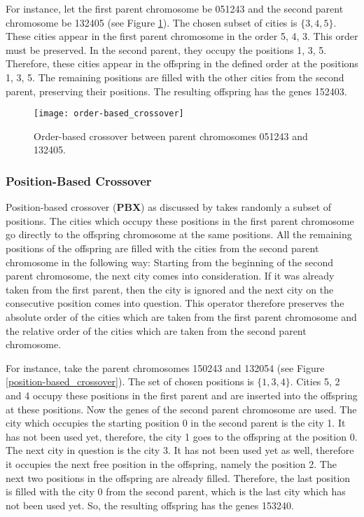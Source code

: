 For instance, let the first parent chromosome be 051243 and the second parent chromosome be 132405 (see Figure \ref{order-based_crossover}). The chosen subset of cities is $\{3,4,5\}$. These cities appear in the first parent chromosome in the order 5, 4, 3. This order must be preserved. In the second parent, they occupy the positions 1, 3, 5. Therefore, these cities appear in the offspring in the defined order at the positions 1, 3, 5. The remaining positions are filled with the other cities from the second parent, preserving their positions. The resulting offspring has the genes 152403.

\begin{figure}[htp] \centering
	\centering
	\texttt{[image: order-based\_crossover]}
	\caption{Order-based crossover between parent chromosomes 051243 and 132405.}
	\label{order-based_crossover}
\end{figure}

\subsubsection{Position-Based Crossover}
\label{subsubsec:position_based}
Position-based crossover (\textbf{PBX}) as discussed by \citeauthor{potvin1996genetic} \cite{potvin1996genetic} takes randomly a subset of positions. The cities which occupy these positions in the first parent chromosome go directly to the offspring chromosome at the same positions. All the remaining positions of the offspring are filled with the cities from the second parent chromosome in the following way: Starting from the beginning of the second parent chromosome, the next city comes into consideration. If it was already taken from the first parent, then the city is ignored and the next city on the consecutive position comes into question. This operator therefore preserves the absolute order of the cities which are taken from the first parent chromosome and the relative order of the cities which are taken from the second parent chromosome.\par
For instance, take the parent chromosomes 150243 and 132054 (see Figure \ref{position-based_crossover}). The set of chosen positions is $\{1,3,4\}$. Cities 5, 2 and 4 occupy these positions in the first parent and are inserted into the offspring at these positions. Now the genes of the second parent chromosome are used. The city which occupies the starting position 0 in the second parent is the city 1. It has not been used yet, therefore, the city 1 goes to the offspring at the position 0. The next city in question is the city 3. It has not been used yet as well, therefore it occupies the next free position in the offspring, namely the position 2. The next two positions in the offspring are already filled. Therefore, the last position is filled with the city 0 from the second parent, which is the last city which has not been used yet.
So, the resulting offspring has the genes 153240.\par

